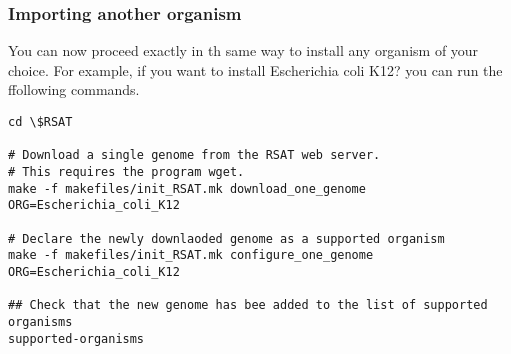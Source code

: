 \subsubsection{Importing another organism}

You can now proceed exactly in th same way to install any organism of
your choice. For example, if you want to install Escherichia coli K12?
you can run the ffollowing commands.

\begin{small}
\begin{verbatim}
cd \$RSAT

# Download a single genome from the RSAT web server. 
# This requires the program wget.
make -f makefiles/init_RSAT.mk download_one_genome ORG=Escherichia_coli_K12

# Declare the newly downlaoded genome as a supported organism
make -f makefiles/init_RSAT.mk configure_one_genome ORG=Escherichia_coli_K12

## Check that the new genome has bee added to the list of supported organisms
supported-organisms
\end{verbatim}
\end{small}

